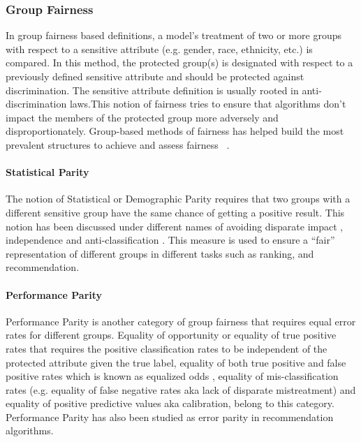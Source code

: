 \subsubsection{Group Fairness}
In group fairness based definitions, a model’s treatment of two or more groups with respect to a sensitive attribute (e.g. gender, race, ethnicity, etc.) is compared. In this method, the protected group(s) is designated with respect to a previously defined sensitive attribute and should be protected against discrimination. The sensitive attribute definition is usually rooted in anti-discrimination laws\cite{barocas2016big}.This notion of fairness tries to ensure that algorithms don't impact the members of the protected group more adversely and disproportionately. Group-based methods of fairness has helped build the most prevalent structures to achieve and assess fairness ~\cite{zemel2013learning,kamishima2012fairness,kamiran2010discrimination,zhang2017anti}.

\paragraph{Statistical Parity}
The notion of Statistical or Demographic Parity requires that two groups with a different sensitive group have the same chance of getting a positive result. This notion has been discussed under different names of avoiding disparate impact \cite{Feldman2015}, independence \cite{barocas2018fairness} and anti-classification \cite{corbett2018measure}. This measure is used to ensure a ``fair'' representation of different groups in different tasks such as ranking\cite{singh2018fairness,zehlike2017fa,yang2017measuring}, and recommendation\cite{mehtora2018towards,ekstrand2018exploring}.
    
\paragraph{Performance Parity}
Performance Parity is another category of group fairness that requires equal error rates for different groups. Equality of opportunity or equality of true positive rates \cite{hardt2016equality} that requires the positive classification rates to be independent of the protected attribute given the true label, equality of both true positive and false positive rates which is known as equalized odds \cite{hardt2016equality}, equality of mis-classification rates (e.g. equality of false negative rates aka lack of disparate mistreatment\cite{zafar2017fairness}) and equality of positive predictive values aka calibration, belong to this category. 
    Performance Parity has also been studied as error parity in recommendation algorithms\cite{ekstrand2018all,yao_huang_fatml-2017}.


